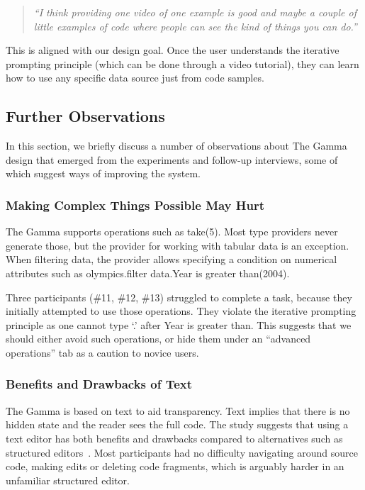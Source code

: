 \documentclass[manuscript,review,anonymous]{acmart}
\newcommand{\ikvd}[1]{{\fontfamily{zi4}\selectfont\small #1}}
\begin{document}
\begin{quote}
  \emph{``I think providing one video of one example is good and maybe a couple of little examples
  of code where people can see the kind of things you can do.''}
\end{quote}

\noindent
This is aligned with our design goal. Once the user understands the iterative prompting principle
(which can be done through a video tutorial), they can learn how to use any specific data source
just from code samples.

\subsection{Further Observations}
\label{sec:study-obs}
In this section, we briefly discuss a number of observations about The Gamma design that
emerged from the experiments and follow-up interviews, some of which suggest ways of improving the system.

\subsubsection*{Making Complex Things Possible May Hurt}
The Gamma supports operations such as \ikvd{take(5)}. Most type
providers never generate those, but the provider for working with tabular data is an exception.
When filtering data, the provider allows specifying a condition on numerical attributes such as
\ikvd{olympics.\textquotesingle filter data\textquotesingle.\textquotesingle Year is greater than\textquotesingle(2004)}.

Three participants (\#11, \#12, \#13) struggled to complete a task, because they
initially attempted to use those operations. They violate the iterative prompting
principle as one cannot type `.' after \ikvd{\textquotesingle Year is greater than\textquotesingle}.
This suggests that we should either avoid such operations, or hide them under an ``advanced operations''
tab as a caution to novice users.

\subsubsection*{Benefits and Drawbacks of Text}
The Gamma is based on text to aid transparency. Text implies that there is no hidden state and
the reader sees the full code. The study suggests that using a text editor has both
benefits and drawbacks compared to alternatives such as structured editors~\cite{structure-based,livenut,lamdu}.
Most participants had no difficulty navigating around source code, making edits or deleting code
fragments, which is arguably harder in an unfamiliar structured editor.
\end{document}
